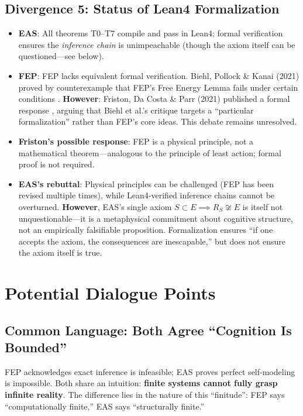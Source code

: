 \documentclass[11pt,a4paper]{article}
\begin{document}
\subsection{Divergence 5: Status of Lean4 Formalization}

\begin{itemize}[leftmargin=*]
\item \textbf{EAS}: All theorems T0--T7 compile and pass in Lean4; formal verification ensures the \emph{inference chain} is unimpeachable (though the axiom itself can be questioned---see below).
\item \textbf{FEP}: FEP lacks equivalent formal verification. Biehl, Pollock \& Kanai (2021) proved by counterexample that FEP's Free Energy Lemma fails under certain conditions \cite{biehl2021}. \textbf{However}: Friston, Da Costa \& Parr (2021) published a formal response \cite{friston2021response}, arguing that Biehl et al.'s critique targets a ``particular formalization'' rather than FEP's core ideas. This debate remains unresolved.
\item \textbf{Friston's possible response}: FEP is a physical principle, not a mathematical theorem---analogous to the principle of least action; formal proof is not required.
\item \textbf{EAS's rebuttal}: Physical principles can be challenged (FEP has been revised multiple times), while Lean4-verified inference chains cannot be overturned. \textbf{However}, EAS's single axiom $S \subset E \implies R_S \not\cong E$ is itself not unquestionable---it is a metaphysical commitment about cognitive structure, not an empirically falsifiable proposition. Formalization ensures ``if one accepts the axiom, the consequences are inescapable,'' but does not ensure the axiom itself is true.
\end{itemize}

\section{Potential Dialogue Points}

\subsection{Common Language: Both Agree ``Cognition Is Bounded''}

FEP acknowledges exact inference is infeasible; EAS proves perfect self-modeling is impossible. Both share an intuition: \textbf{finite systems cannot fully grasp infinite reality}. The difference lies in the nature of this ``finitude'': FEP says ``computationally finite,'' EAS says ``structurally finite.''
\end{document}
